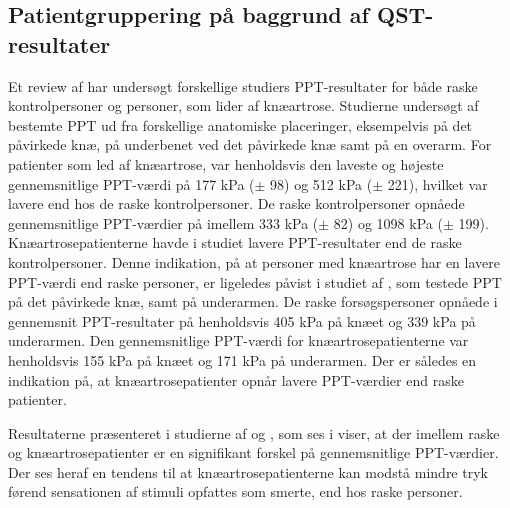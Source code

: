 \subsection{Patientgruppering på baggrund af QST-resultater}
Et review af  har undersøgt forskellige studiers PPT-resultater for både raske kontrolpersoner og personer, som lider af knæartrose. Studierne undersøgt af  bestemte PPT ud fra forskellige anatomiske placeringer, eksempelvis på det påvirkede knæ, på underbenet ved det påvirkede knæ samt på en overarm. For patienter som led af knæartrose, var henholdsvis den laveste og højeste gennemsnitlige PPT-værdi på 177 kPa ($\pm$ 98) og 512 kPa ($\pm$ 221), hvilket var lavere end hos de raske kontrolpersoner. De raske kontrolpersoner opnåede gennemsnitlige PPT-værdier på imellem 333 kPa ($\pm$ 82) og 1098 kPa ($\pm$ 199). Knæartrosepatienterne havde i studiet lavere PPT-resultater end de raske kontrolpersoner. \citep{Suokas2012} Denne indikation, på at personer med knæartrose har en lavere PPT-værdi end raske personer, er ligeledes påvist i studiet af , som testede PPT på det påvirkede knæ, samt på underarmen. De raske forsøgspersoner opnåede i gennemsnit PPT-resultater på henholdsvis 405 kPa på knæet og 339 kPa på underarmen. Den gennemsnitlige PPT-værdi for knæartrosepatienterne var henholdsvis 155 kPa på knæet og 171 kPa på underarmen. Der er således en indikation på, at knæartrosepatienter opnår lavere PPT-værdier end raske patienter. \citep{Soukas2012} \citep{Wylde2013}

\begin{table}[H]
	\centering
	\caption{I tabellen ses resultaterne vedrørende PPT-målinger på henholdsvis raske personer og knæartrosepatienter.}
	\label{tab:PPT_rask_syg}
\end{table}\vspace{-.25cm}

Resultaterne præsenteret i studierne af  og , som ses i  viser, at der imellem raske og knæartrosepatienter er en signifikant forskel på gennemsnitlige PPT-værdier. Der ses heraf en tendens til at knæartrosepatienterne kan modstå mindre tryk førend sensationen af stimuli opfattes som smerte, end hos raske personer.

